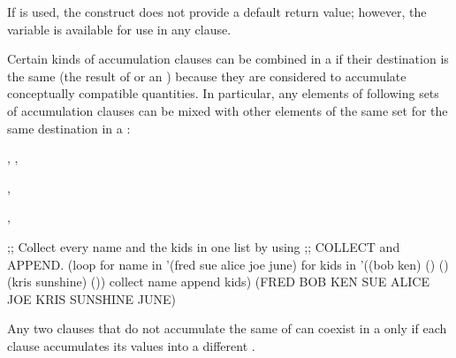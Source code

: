 If  is used,
the construct does not provide a default return value;
however, the variable is available
for use in any  clause.  
     
 
Certain kinds of accumulation clauses can be combined in a  
if their destination is the same 
(the result of  or an  ) 
because they are considered to accumulate conceptually compatible quantities.
In particular, 
any elements of following sets of accumulation clauses can be mixed
with other elements of the same set for the same destination 
in a  :

\beginlist
\itemitem{\bull} , , 

\itemitem{\bull} , 

\itemitem{\bull} , 
\endlist

\code
;; Collect every name and the kids in one list by using 
;; COLLECT and APPEND.
 (loop for name in '(fred sue alice joe june)
       for kids in '((bob ken) () () (kris sunshine) ())
       collect name
       append kids)
\EV (FRED BOB KEN SUE ALICE JOE KRIS SUNSHINE JUNE)
\endcode
 
Any two
clauses that do not accumulate the same  of 
can coexist in a  only 
if each clause accumulates its values into 
a different
.  

